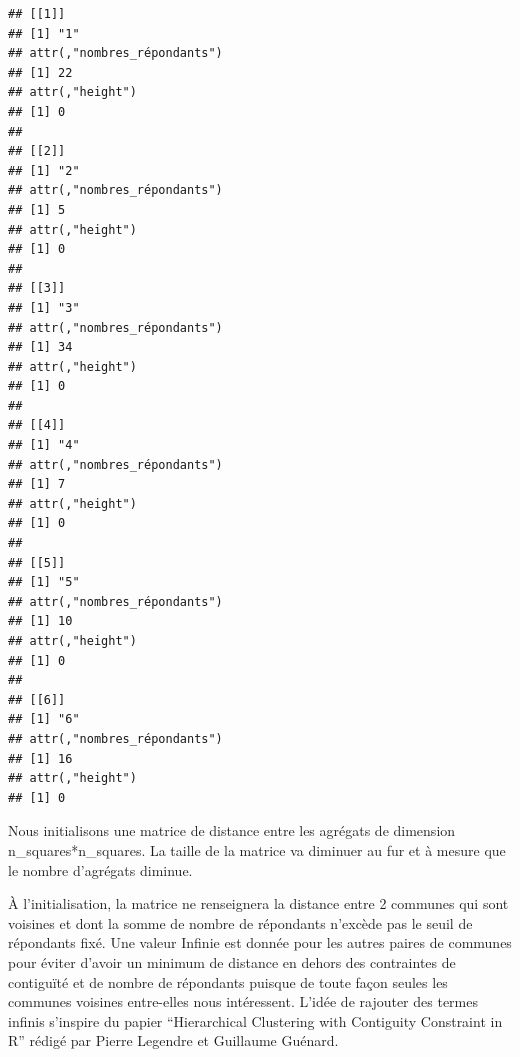 \documentclass[
]{article}
\begin{document}
\begin{verbatim}
## [[1]]
## [1] "1"
## attr(,"nombres_répondants")
## [1] 22
## attr(,"height")
## [1] 0
## 
## [[2]]
## [1] "2"
## attr(,"nombres_répondants")
## [1] 5
## attr(,"height")
## [1] 0
## 
## [[3]]
## [1] "3"
## attr(,"nombres_répondants")
## [1] 34
## attr(,"height")
## [1] 0
## 
## [[4]]
## [1] "4"
## attr(,"nombres_répondants")
## [1] 7
## attr(,"height")
## [1] 0
## 
## [[5]]
## [1] "5"
## attr(,"nombres_répondants")
## [1] 10
## attr(,"height")
## [1] 0
## 
## [[6]]
## [1] "6"
## attr(,"nombres_répondants")
## [1] 16
## attr(,"height")
## [1] 0
\end{verbatim}

Nous initialisons une matrice de distance entre les agrégats de
dimension n\_squares*n\_squares. La taille de la matrice va diminuer au
fur et à mesure que le nombre d'agrégats diminue.

À l'initialisation, la matrice ne renseignera la distance entre 2
communes qui sont voisines et dont la somme de nombre de répondants
n'excède pas le seuil de répondants fixé. Une valeur Infinie est donnée
pour les autres paires de communes pour éviter d'avoir un minimum de
distance en dehors des contraintes de contiguïté et de nombre de
répondants puisque de toute façon seules les communes voisines
entre-elles nous intéressent. L'idée de rajouter des termes infinis
s'inspire du papier ``Hierarchical Clustering with Contiguity Constraint
in R'' rédigé par Pierre Legendre et Guillaume Guénard.
\end{document}
